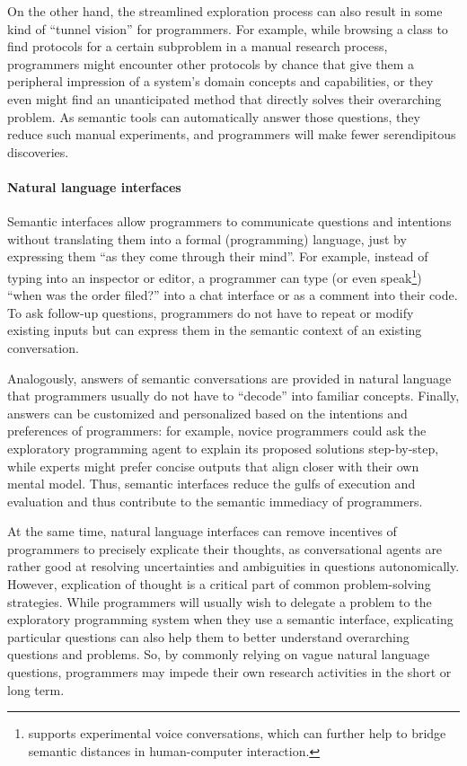 On the other hand, the streamlined exploration process can also result in some kind of ``tunnel vision'' for programmers.
For example, while browsing a class to find protocols for a certain subproblem in a manual research process, programmers might encounter other protocols by chance that give them a peripheral impression of a system's domain concepts and capabilities, or they even might find an unanticipated method that directly solves their overarching problem.
As semantic tools can automatically answer those questions, they reduce such manual experiments, and programmers will make fewer serendipitous discoveries.

\paragraph{Natural language interfaces}
\label{par:discussion/experience/process/language}

Semantic interfaces allow programmers to communicate questions and intentions without translating them into a formal (programming) language, just by expressing them ``as they come through their mind''.
For example, instead of typing  into an inspector or editor, a programmer can type (or even speak\footnote{\semtex supports experimental voice conversations, which can further help to bridge semantic distances in human-computer interaction.}) ``when was the order filed?'' into a chat interface or as a comment into their code.
To ask follow-up questions, programmers do not have to repeat or modify existing inputs but can express them in the semantic context of an existing conversation.

Analogously, answers of semantic conversations are provided in natural language that programmers usually do not have to ``decode'' into familiar concepts.
Finally, answers can be customized and personalized based on the intentions and preferences of programmers: for example, novice programmers could ask the exploratory programming agent to explain its proposed solutions step-by-step, while experts might prefer concise outputs that align closer with their own mental model.
Thus, semantic interfaces reduce the gulfs of execution and evaluation and thus contribute to the semantic immediacy of programmers.

At the same time, natural language interfaces can remove incentives of programmers to precisely explicate their thoughts, as conversational agents are rather good at resolving uncertainties and ambiguities in questions autonomically.
However, explication of thought is a critical part of common problem-solving strategies.
While programmers will usually wish to delegate a problem to the exploratory programming system when they use a semantic interface, explicating particular questions can also help them to better understand overarching questions and problems.
So, by commonly relying on vague natural language questions, programmers may impede their own research activities in the short or long term.

